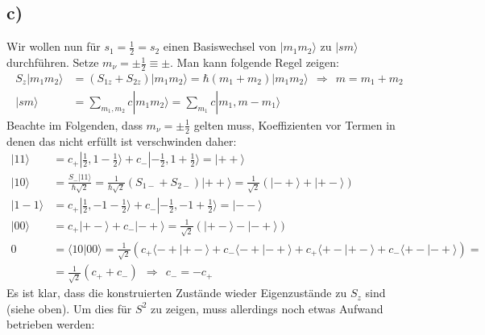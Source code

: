 \documentclass[a4paper,12pt]{article}
\newcommand{\brak}{}
\newcommand{\kla}{}
\newcommand{\Ket}{}
\begin{document}
\subsection*{c)}
Wir wollen nun für $s_1=\frac{1}{2}=s_2$ einen Basiswechsel von $\Ket | {m_1m_2} \rangle$ zu $\Ket | {sm} \rangle$ durchführen. Setze $m_\nu = \pm\frac{1}{2}\equiv\pm$. Man kann folgende Regel zeigen:
\begin{align*}
S_z\Ket | {m_1m_2} \rangle&=\kla\left( {S_{1z}+S_{2z}} \right)\Ket | {m_1m_2} \rangle=\hbar\kla\left( {m_1+m_2} \right)\Ket | {m_1m_2} \rangle\ \ \Rightarrow\ \ m=m_1+m_2\\
\Ket | {sm} \rangle&=\sum_{m_1,m_2}c\Ket | {m_1m_2} \rangle=\sum_{m_1}c\Ket | {m_1,m-m_1} \rangle
\end{align*}
Beachte im Folgenden, dass $m_\nu=\pm\frac{1}{2}$ gelten muss, Koeffizienten vor Termen in denen das nicht erfüllt ist verschwinden daher:
\begin{align*}
\Ket | {11} \rangle&=c_+\Ket | {\frac{1}{2},1-\frac{1}{2}} \rangle+c_-\Ket | {-\frac{1}{2},1+\frac{1}{2}} \rangle=\Ket | {++} \rangle\\
\Ket | {10} \rangle&=\frac{S_-\Ket | {11} \rangle}{\hbar\sqrt{2}}=\frac{1}{\hbar\sqrt{2}}\kla\left( {S_{1-}+S_{2-}} \right)\Ket | {++} \rangle=\frac{1}{\sqrt{2}}\kla\left( {\Ket | {-+} \rangle+\Ket | {+-} \rangle} \right)\\
\Ket | {1-1} \rangle&=c_+\Ket | {\frac{1}{2},-1-\frac{1}{2}} \rangle+c_-\Ket | {-\frac{1}{2},-1+\frac{1}{2}} \rangle=\Ket | {--} \rangle\\
\Ket | {00} \rangle&=c_+\Ket | {+-} \rangle+c_-\Ket | {-+} \rangle=\frac{1}{\sqrt{2}}\kla\left( {\Ket | {+-} \rangle-\Ket | {-+} \rangle} \right)\\
0&=\brak\langle {10}| {00}\rangle=\frac{1}{\sqrt{2}}\kla\left( {c_+\brak\langle {-+}| {+-}\rangle+c_-\brak\langle {-+}| {-+}\rangle+c_+\brak\langle {+-}| {+-}\rangle+c_-\brak\langle {+-}| {-+}\rangle} \right)=\\
&=\frac{1}{\sqrt{2}}\kla\left( {c_++c_-} \right)\ \ \Rightarrow\ \ c_-=-c_+
\end{align*}
Es ist klar, dass die konstruierten Zustände wieder Eigenzustände zu $S_z$ sind (siehe oben). Um dies für $S^2$ zu zeigen, muss allerdings noch etwas Aufwand betrieben werden:
\end{document}
